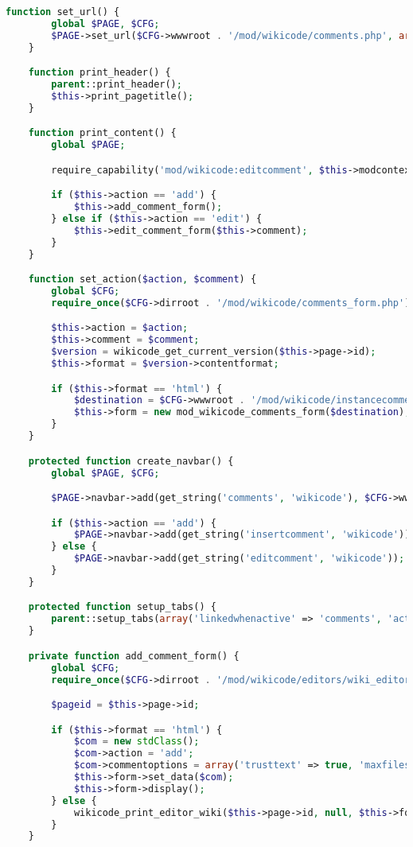 \begin{lstlisting}[language=PHP]
    function set_url() {
        global $PAGE, $CFG;
        $PAGE->set_url($CFG->wwwroot . '/mod/wikicode/comments.php', array('pageid' => $this->page->id));
    }

    function print_header() {
        parent::print_header();
        $this->print_pagetitle();
    }

    function print_content() {
        global $PAGE;

        require_capability('mod/wikicode:editcomment', $this->modcontext, NULL, true, 'noeditcommentpermission', 'wikicode');

        if ($this->action == 'add') {
            $this->add_comment_form();
        } else if ($this->action == 'edit') {
            $this->edit_comment_form($this->comment);
        }
    }

    function set_action($action, $comment) {
        global $CFG;
        require_once($CFG->dirroot . '/mod/wikicode/comments_form.php');

        $this->action = $action;
        $this->comment = $comment;
        $version = wikicode_get_current_version($this->page->id);
        $this->format = $version->contentformat;

        if ($this->format == 'html') {
            $destination = $CFG->wwwroot . '/mod/wikicode/instancecomments.php?pageid=' . $this->page->id;
            $this->form = new mod_wikicode_comments_form($destination);
        }
    }

    protected function create_navbar() {
        global $PAGE, $CFG;

        $PAGE->navbar->add(get_string('comments', 'wikicode'), $CFG->wwwroot . '/mod/wikicode/comments.php?pageid=' . $this->page->id);

        if ($this->action == 'add') {
            $PAGE->navbar->add(get_string('insertcomment', 'wikicode'));
        } else {
            $PAGE->navbar->add(get_string('editcomment', 'wikicode'));
        }
    }

    protected function setup_tabs() {
        parent::setup_tabs(array('linkedwhenactive' => 'comments', 'activetab' => 'comments'));
    }

    private function add_comment_form() {
        global $CFG;
        require_once($CFG->dirroot . '/mod/wikicode/editors/wiki_editor.php');

        $pageid = $this->page->id;

        if ($this->format == 'html') {
            $com = new stdClass();
            $com->action = 'add';
            $com->commentoptions = array('trusttext' => true, 'maxfiles' => 0);
            $this->form->set_data($com);
            $this->form->display();
        } else {
            wikicode_print_editor_wiki($this->page->id, null, $this->format, -1, null, false, null, 'addcomments');
        }
    }


\end{lstlisting}
